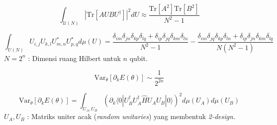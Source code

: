 \begin{equation}
    \int_{\mathcal{U}(N)} |\text{Tr}[A U B U^\dagger]|^2 dU \approx \frac{\text{Tr}[A^2] \text{Tr}[B^2]}{N^2 - 1}
\end{equation}

\begin{equation}
    \int_{U(N)} U_{i,j} U_{k,l} U^*_{m,n} U^*_{p,q} d\mu(U) = \frac{\delta_{im}\delta_{jn}\delta_{kp}\delta_{lq} + \delta_{ip}\delta_{jq}\delta_{km}\delta_{ln}}{N^2 - 1} - \frac{\delta_{im}\delta_{jq}\delta_{kp}\delta_{ln} + \delta_{ip}\delta_{jn}\delta_{km}\delta_{lq}}{N(N^2 - 1)}
\end{equation}
$N = 2^n$ : Dimensi ruang Hilbert untuk $n$ qubit.

\begin{equation}
    \text{Var}_{\theta} \left[ \partial_k E(\theta) \right] \sim \frac{1}{2^{2n}}
\end{equation}

\begin{equation}
    \text{Var}_{\theta} \left[ \partial_k E(\theta) \right] = \int_{U_A, U_B} \left( \partial_k \langle 0 | U_B^\dagger U_A^\dagger \hat{H} U_A U_B | 0 \rangle \right)^2 d\mu(U_A) d\mu(U_B)
\end{equation}
$U_A, U_B$ : Matriks uniter acak (\textit{random unitaries}) yang membentuk \textit{2-design}.
